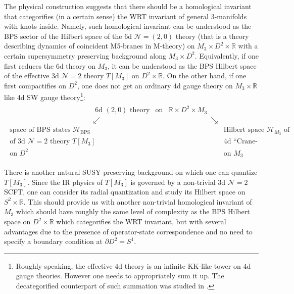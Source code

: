 \documentclass[hyper,letterpaper]{JHEP3}
\newcommand{\beq}{\begin{equation}\begin{aligned}}
\newcommand{\eeq}{\end{aligned}\end{equation}}
\newcommand{\R}{{\mathbb R}}
\def\CH{{\mathcal H}}
\def\CN{{\mathcal N}}
\begin{document}
The physical construction suggests that there should be a homological invariant that categorifies (in a certain sense)
the WRT invariant of general 3-manifolds with knots inside.
Namely, such homological invariant can be understood as the BPS sector of the Hilbert space of
the 6d $\CN=(2,0)$ theory (that is a theory describing dynamics of coincident M5-branes in M-theory)
on $M_3\times D^2\times \R$ with a certain supersymmetry preserving background along $M_3\times D^2$.
Equivalently, if one first reduces the 6d theory on $M_3$,
it can be understood as the BPS Hilbert space of the effective 3d $\CN=2$ theory $T[M_3]$ on $D^2\times \R$.
On the other hand, if one first compactifies on $D^2$, one does not get an ordinary 4d gauge theory on $M_3\times \R$ like 4d SW gauge theory\footnote{Roughly speaking, the effective 4d theory is an infinite KK-like tower on 4d gauge theories. However one needs to appropriately sum it up. The decategorified counterpart of such summation was studied in \cite{Gukov:2016njj}.}:
\beq
\begin{array}{ccccc}
\; & \;\text{6d $(2,0)$ theory} &\text{on}  &\text{$\R\times D^2\times M_3$}  \; & \; \\
\; & \swarrow \qquad\qquad\qquad& \; &\qquad\qquad\qquad \searrow & \; \\
\text{space of BPS states $\CH_{\text{BPS}}$  } & \; & \; & \; & \text{Hilbert space $\CH_{M_3}$ of } \\
\text{of 3d $\CN=2$ theory $T[M_3]$} & \; & \; & \; & \text{4d ``Crane-Frenkel TQFT''}\\
\text{on $D^2$} & \; & \; & \; & \text{on $M_3$}
\end{array}
\label{CatGeom0}
\eeq

There is another natural SUSY-preserving background on which one can quantize $T[M_3]$.
Since the IR physics of $T[M_3]$ is governed by a non-trivial 3d $\CN=2$ SCFT,
one can consider its radial quantization and study its Hilbert space on $S^2\times \R$.
This should provide us with another non-trivial homological invariant of $M_3$ which should
have roughly the same level of complexity as the BPS Hilbert space on $D^2\times \R$ which categorifies the WRT invariant,
but with several advantages due to the presence of operator-state correspondence and no need to specify a boundary condition at $\partial D^2=S^1$.
\end{document}
